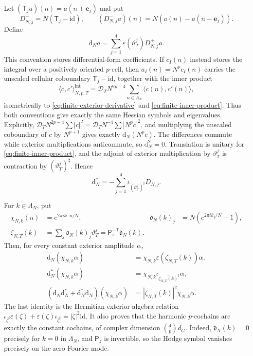 \documentclass[11pt]{article}
\numberwithin{equation}{section}
\theoremstyle{definition}
\theoremstyle{remark}
\newcommand{\dd}{\mathrm d}
\newcommand{\id}{\mathrm{id}}
\begin{document}
Let $(\mathsf T_ja)(n)=a(n+\mathbf e_j)$ and put
\begin{equation}\label{eq:finite-differences}
 D_{N,j}^+=N(\mathsf T_j-\id),\qquad
 (D_{N,j}^-a)(n)=N(a(n)-a(n-\mathbf e_j)).
\end{equation}
Define
\begin{equation}\label{eq:finite-exterior-derivative}
 \dd_Na=\sum_{j=1}^4\varepsilon(\vartheta_T^j)D_{N,j}^+a.
\end{equation}
This convention stores differential-form coefficients.  If $c_I(n)$ instead
stores the integral over a positively oriented $p$-cell, then
$a_I(n)=N^pc_I(n)$ carries the unscaled cellular coboundary
$\mathsf T_j-\id$, together with the inner product
\begin{equation}\label{eq:integrated-cochain-normalization}
 \langle c,c'\rangle^{\mathrm{int}}_{N,p,T}
 =\mathcal D_TN^{2p-4}\sum_{n\in\Lambda_N}
 \langle c(n),c'(n)\rangle,
\end{equation}
isometrically to \eqref{eq:finite-exterior-derivative} and
\eqref{eq:finite-inner-product}.  Thus both conventions give exactly the
same Hessian symbols and eigenvalues.  Explicitly,
$\mathcal D_TN^{2p-4}\sum|c|^2
=\mathcal D_TN^{-4}\sum|N^pc|^2$, and multiplying the unscaled coboundary
of $c$ by $N^{p+1}$ gives exactly $\dd_N(N^pc)$.
The differences commute while exterior multiplications anticommute, so
$\dd_N^2=0$.  Translation is unitary for
\eqref{eq:finite-inner-product}, and the adjoint of exterior multiplication
by $\vartheta_T^j$ is contraction by $(\vartheta_T^j)^\sharp$.  Hence
\begin{equation}\label{eq:finite-adjoint}
 \dd_N^*=-\sum_{j=1}^4
 \iota_{(\vartheta_T^j)^\sharp}D_{N,j}^-.
\end{equation}

For $k\in\Lambda_N$, put
\begin{align}
 \chi_{N,k}(n)&=e^{2\pi i k\cdot n/N},&
 \mathfrak d_N(k)_j&=N(e^{2\pi ik_j/N}-1),
 \label{eq:finite-coordinate-symbol}\\
 \zeta_{N,T}(k)&=\sum_j\mathfrak d_N(k)_j\vartheta_T^j
 =\mathsf P_z^{-\mathsf T}\mathfrak d_N(k).
 \label{eq:finite-physical-symbol}
\end{align}
Then, for every constant exterior amplitude $\alpha$,
\begin{align}
 \dd_N(\chi_{N,k}\alpha)
 &=\chi_{N,k}\varepsilon(\zeta_{N,T}(k))\alpha,\\
 \dd_N^*(\chi_{N,k}\alpha)
 &=\chi_{N,k}\iota_{\overline{\zeta_{N,T}(k)}^\sharp}\alpha,\\
 (\dd_N\dd_N^*+\dd_N^*\dd_N)(\chi_{N,k}\alpha)
 &=|\zeta_{N,T}(k)|^2\chi_{N,k}\alpha.
 \label{eq:finite-Hodge-symbol}
\end{align}
The last identity is the Hermitian exterior-algebra relation
$\iota_{\overline\zeta^\sharp}\varepsilon(\zeta)+
\varepsilon(\zeta)\iota_{\overline\zeta^\sharp}=|\zeta|^2\id$.
It also proves that the harmonic $p$-cochains are exactly the constant
cochains, of complex dimension $\binom4p d_G$.
Indeed, $\mathfrak d_N(k)=0$ precisely for $k=0$ in $\Lambda_N$, and
$\mathsf P_z$ is invertible, so the Hodge symbol vanishes precisely on the
zero Fourier mode.
\end{document}
